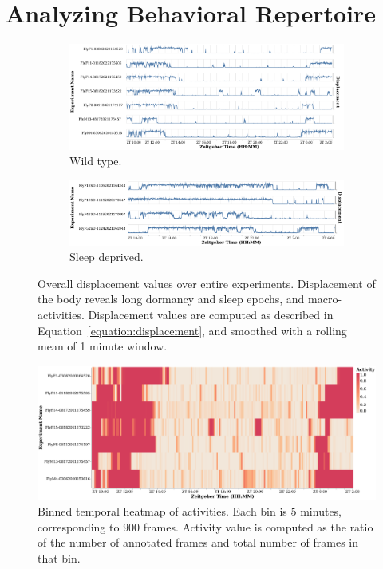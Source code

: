\section{Analyzing Behavioral Repertoire}\label{section:analyzing-behavioral-repertoire}

\begin{figure}[ht!]
	\centering
	\begin{subfigure}[ht!]{0.95\linewidth}
		\centering\includegraphics[width=\linewidth]{figures/Velocity-WT-1T.pdf}
		\caption{Wild type.}
	\end{subfigure}%

	\begin{subfigure}[ht!]{0.95\linewidth}
		\centering\includegraphics[width=\linewidth]{figures/Velocity-SD-1T.pdf}
		\caption{Sleep deprived.}
	\end{subfigure}%
	\caption[Overall displacement values over entire experiments.]{Overall displacement values over entire experiments.
		Displacement of the body reveals long dormancy and sleep epochs, and macro-activities.
		Displacement values are computed as described in Equation~\ref{equation:displacement}, and smoothed with a rolling mean of 1 minute window.}
\end{figure}

\begin{figure}[ht!]
	\centering\includegraphics[width=\linewidth]{figures/ActivityBinned-Ann-WT-5T.pdf}
	\caption[Binned temporal heatmap of activities.]{Binned temporal heatmap of activities.
		Each bin is $5$ minutes, corresponding to $900$ frames.
		Activity value is computed as the ratio of the number of annotated frames and total number of frames in that bin.}
\end{figure}

